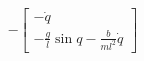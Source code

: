\documentclass[preview]{standalone}
\begin{document}
\begin{align*}
-\begin{bmatrix}-\dot{q} \\ -\frac{g}{l}\sin{q}-\frac{b}{ml^2}\dot{q}\end{bmatrix}
\end{align*}
\end{document}
